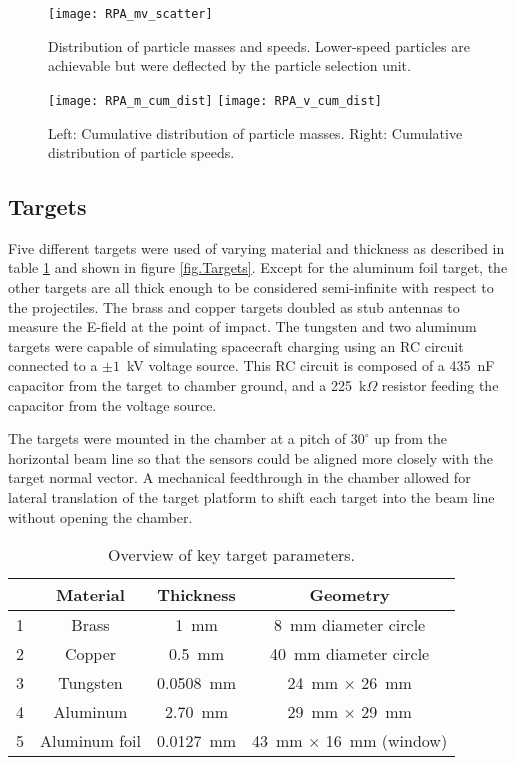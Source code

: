 \begin{figure}[\floatplace]
\begin{center}
\texttt{[image: RPA\_mv\_scatter]}
\end{center}
\caption{\label{fig.ParticleDist} Distribution of particle masses and speeds.  Lower-speed particles are achievable but were deflected by the particle selection unit.}
\end{figure}

\begin{figure}[\floatplace]
\begin{center}
\texttt{[image: RPA\_m\_cum\_dist]}
\texttt{[image: RPA\_v\_cum\_dist]}
\end{center}
\caption{\label{fig.ParticleCumDist} Left: Cumulative distribution of particle masses. Right: Cumulative distribution of particle speeds.}
\end{figure}

\subsection{Targets}
\label{sec.Targets}
Five different targets were used of varying material and thickness as described in table \ref{tab.Targets} and shown in figure \ref{fig.Targets}.  Except for the aluminum foil target, the other targets are all thick enough to be considered semi-infinite with respect to the projectiles.  The brass and copper targets doubled as stub antennas to measure the E-field at the point of impact.  The tungsten and two aluminum targets were capable of simulating spacecraft charging using an RC circuit connected to a $\pm1$~kV voltage source.  This RC circuit is composed of a 435~nF capacitor from the target to chamber ground, and a 225~k$\Omega$ resistor feeding the capacitor from the voltage source.

The targets were mounted in the chamber at a pitch of $30^\circ$ up from the horizontal beam line so that the sensors could be aligned more closely with the target normal vector.  A mechanical feedthrough in the chamber allowed for lateral translation of the target platform to shift each target into the beam line without opening the chamber.

\begin{table}[\floatplace]
\begin{center}
\begin{tabular}{cccc}
 & Material & Thickness & Geometry \\
 \hline
1 & Brass & 1~mm & 8~mm diameter circle \\
2 & Copper & 0.5~mm & 40~mm diameter circle\\
3 & Tungsten & 0.0508~mm & 24~mm $\times$ 26~mm\\
4 & Aluminum & 2.70~mm & 29~mm $\times$ 29~mm\\
5 & Aluminum foil & 0.0127~mm & 43~mm $\times$ 16~mm (window)
\end{tabular}
\end{center}
\caption{\label{tab.Targets} Overview of key target parameters.}
\end{table}

